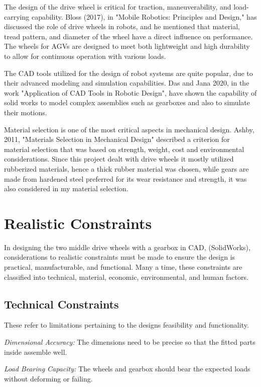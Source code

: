 \documentclass[../../main]{subfiles}
\begin{document}
The design of the drive wheel is critical for traction, maneuverability,
and load-carrying capability. Bloss (2017), in "Mobile Robotics:
Principles and Design," has discussed the role of drive wheels in
robots, and he mentioned that material, tread pattern, and diameter of
the wheel have a direct influence on performance. The wheels for AGVs
are designed to meet both lightweight and high durability to allow for
continuous operation with various loads.

The CAD tools utilized for the design of robot systems are quite
popular, due to their advanced modeling and simulation capabilities. Das
and Jana 2020, in the work "Application of CAD Tools in Robotic Design",
have shown the capability of solid works to model complex assemblies
such as gearboxes and also to simulate their motions.

Material selection is one of the most critical aspects in mechanical
design. Ashby, 2011, "Materials Selection in Mechanical Design"
described a criterion for material selection that was based on strength,
weight, cost and environmental considerations. Since this project dealt
with drive wheels it mostly utilized rubberized materials, hence a thick
rubber material was chosen, while gears are made from hardened steel
preferred for its wear resistance and strength, it was also considered
in my material selection.

\section{ Realistic Constraints}

In designing the two middle drive wheels with a gearbox in CAD,
(SolidWorks), considerations to realistic constraints must be made to
ensure the design is practical, manufacturable, and functional. Many a
time, these constraints are classified into technical, material,
economic, environmental, and human factors.

\subsection{Technical Constraints}

These refer to limitations pertaining to the design\textquotesingle s
feasibility and functionality.

\emph{Dimensional Accuracy:} The dimensions need to be precise so that
the fitted parts inside assemble well.

\emph{ Load Bearing Capacity:} The wheels and gearbox should bear the
expected loads without deforming or failing.
\end{document}
